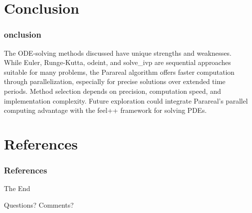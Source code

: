 \documentclass[
	11pt,
]{beamer}
\begin{document}
\section{Conclusion}

\begin{frame}
	\frametitle{ onclusion}
	The ODE-solving methods discussed have unique strengths and weaknesses. While Euler, Runge-Kutta, odeint, and solve_ivp are sequential approaches suitable for many problems, the Parareal algorithm offers faster computation through parallelization, especially for precise solutions over extended time periods. Method selection depends on precision, computation speed, and implementation complexity. Future exploration could integrate Parareal's parallel computing advantage with the feel++ framework for solving PDEs.


\end{frame}






\section{References}

\begin{frame}[allowframebreaks]
	\frametitle{References}
	
	
  \end{frame}


\begin{frame}
	\begin{center}
		{\Huge The End}

		\bigskip\bigskip

		{\LARGE Questions? Comments?}
	\end{center}
\end{frame}

\end{document}
